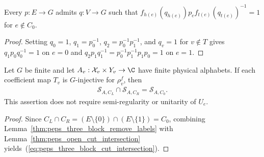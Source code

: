 \begin{lemma}%
    \label{thm:peps_three_block_remove_labels}
    \leanok
    Every $p:E\to G$ admits $q:V\to G$ such that
    $f_{h(e)}(q_{h(e)})p_ef_{t(e)}(q_{t(e)})^{-1}=1$ for $e\notin C_0$.
\end{lemma}
\begin{proof}\leanok
    Setting $q_0=1$, $q_1=p_0^{-1}$, $q_2=p_0^{-1}p_1^{-1}$, and $q_v=1$ for
    $v\notin T$ gives $q_1p_0q_0^{-1}=1$ on $e=0$ and
    $q_2p_1q_1^{-1}=p_0^{-1}p_1^{-1}p_1p_0=1$ on $e=1$.
\end{proof}

\begin{lemma}%
    \label{thm:peps_three_block_cut_intersection}
    \leanok
    Let $G$ be finite and let $A_v:\mathcal X_v\times Y_v\to\C$
    have finite physical alphabets. If each coefficient map $T_v$ is
    $G$-injective for $\rho_v^f$, then
    \begin{align}
        \mathcal S_{A,C_L}\cap\mathcal S_{A,C_R}=\mathcal S_{A,C_0}.
        \label{eq:peps_three_block_cut_intersection}
    \end{align}
    This assertion does not require semi-regularity or unitarity of $U_e$.
\end{lemma}
\begin{proof}\leanok
    Since $C_L\cap C_R=(E\setminus\{0\})\cap(E\setminus\{1\})=C_0$, combining
    Lemma~\ref{thm:peps_three_block_remove_labels} with
    Lemma~\ref{thm:peps_open_cut_intersection} yields~(\ref{eq:peps_three_block_cut_intersection}).
\end{proof}


